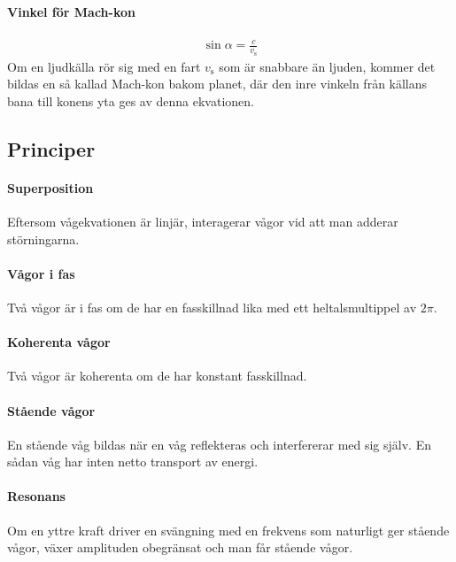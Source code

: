 \paragraph{Vinkel för Mach-kon}
\begin{align*}
	\sin{\alpha} = \frac{c}{v_{\text{s}}}
\end{align*}
Om en ljudkälla rör sig med en fart $v_{\text{s}}$ som är snabbare än ljuden, kommer det bildas en så kallad Mach-kon bakom planet, där den inre vinkeln från källans bana till konens yta ges av denna ekvationen.

\deriv

\subsection{Principer}

\paragraph{Superposition}
Eftersom vågekvationen är linjär, interagerar vågor vid att man adderar störningarna.

\paragraph{Vågor i fas}
Två vågor är i fas om de har en fasskillnad lika med ett heltalsmultippel av $2\pi$.

\paragraph{Koherenta vågor}
Två vågor är koherenta om de har konstant fasskillnad.

\paragraph{Stående vågor}
En stående våg bildas när en våg reflekteras och interfererar med sig själv. En sådan våg har inten netto transport av energi.

\paragraph{Resonans}
Om en yttre kraft driver en svängning med en frekvens som naturligt ger stående vågor, växer amplituden obegränsat och man får stående vågor.